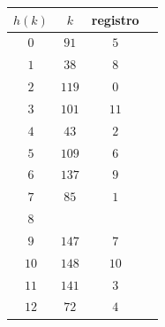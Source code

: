 \documentclass[10pt,a4paper,spanish]{report}
\begin{document}
\begin{minipage}{0.5\textwidth}
\begin{tabular}{c | c | c | c}
$h(k)$ & $k$ & registro \\
\hline
$0$ & $91$ & $5$ \\
$1$ & $38$ & $8$ \\
$2$ & $119$ & $0$ \\
$3$ & $101$ & $11$ \\
$4$ & $43$ & $2$ \\
$5$ & $109$ & $6$ \\
$6$ & $137$ & $9$ \\
$7$ & $85$ & $1$ \\
$8$ & & \\
$9$ & $147$ & $7$ \\
$10$ & $148$ & $10$ \\
$11$ & $141$ & $3$ \\
$12$ & $72$ & $4$ \\
\end{tabular}
\end{minipage}
\end{document}
